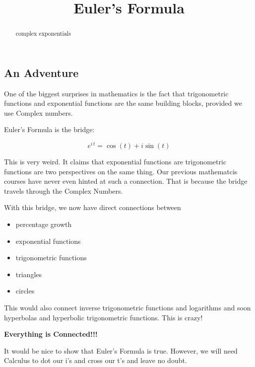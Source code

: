 \documentclass{ximera}
\title{Euler's Formula}
\begin{document}
\begin{abstract}
complex exponentials
\end{abstract}
\maketitle






\subsection*{An Adventure}




One of the biggest surprises in mathematics is the fact that trigonometric functions and exponential functions are the same building blocks, provided we use Complex numbers. 


Euler's Formula is the bridge:



\[    e^{i \, t} = \cos(t) + i \sin(t)    \]



This is very weird.  It claims that exponential functions are trigonometric functions are two perspectives on the same thing.  Our previous mathematcis courses have never even hinted at such a connection.  That is because the bridge  travels through the Complex Numbers.



With this bridge, we now have direct connections between


\begin{itemize}
\item percentage growth
\item exponential functions
\item trigonometric functions
\item triangles
\item circles
\end{itemize}

This would also connect inverse trigonometric functions and logarithms and soon hyperbolas and hyperbolic trigonometric functions.  This is crazy!


\begin{center}
\textbf{\textcolor{red!70!black}{Everything is Connected!!!}}
\end{center}






It would be nice to show that Euler's Formula is true.  However, we will need Calculus to dot our i's and cross our t's and leave no doubt.   
\end{document}
